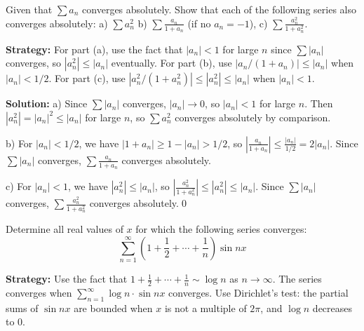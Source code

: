 \begin{problembox}
\begin{problemstatement}
Given that \(\sum a_n\) converges absolutely. Show that each of the following series also converges absolutely:
a) \(\sum a_n^2\) b) \(\sum \frac{a_n}{1 + a_n}\) (if no \(a_n = -1\)),
c) \(\sum \frac{a_n^2}{1 + a_n^2}\).
\end{problemstatement}
\end{problembox}

\noindent\textbf{Strategy:} For part (a), use the fact that \(|a_n| < 1\) for large \(n\) since \(\sum |a_n|\) converges, so \(|a_n^2| \leq |a_n|\) eventually. For part (b), use \(|a_n/(1+a_n)| \leq |a_n|\) when \(|a_n| < 1/2\). For part (c), use \(|a_n^2/(1+a_n^2)| \leq |a_n^2| \leq |a_n|\) when \(|a_n| < 1\).

\bigskip\noindent\textbf{Solution:}
a) Since \(\sum |a_n|\) converges, \(|a_n| \to 0\), so \(|a_n| < 1\) for large \(n\). Then \(|a_n^2| = |a_n|^2 \leq |a_n|\) for large \(n\), so \(\sum a_n^2\) converges absolutely by comparison.

b) For \(|a_n| < 1/2\), we have \(|1 + a_n| \geq 1 - |a_n| > 1/2\), so \(\left|\frac{a_n}{1 + a_n}\right| \leq \frac{|a_n|}{1/2} = 2|a_n|\). Since \(\sum |a_n|\) converges, \(\sum \frac{a_n}{1 + a_n}\) converges absolutely.

c) For \(|a_n| < 1\), we have \(|a_n^2| \leq |a_n|\), so \(\left|\frac{a_n^2}{1 + a_n^2}\right| \leq |a_n^2| \leq |a_n|\). Since \(\sum |a_n|\) converges, \(\sum \frac{a_n^2}{1 + a_n^2}\) converges absolutely.\qed



\begin{problembox}
\begin{problemstatement}
Determine all real values of \(x\) for which the following series converges:
\[\sum_{n=1}^{\infty} \left( 1 + \frac{1}{2} + \cdots + \frac{1}{n} \right) \sin nx\]
\end{problemstatement}
\end{problembox}

\noindent\textbf{Strategy:} Use the fact that \(1 + \frac{1}{2} + \cdots + \frac{1}{n} \sim \log n\) as \(n \to \infty\). The series converges when \(\sum_{n=1}^{\infty} \log n \cdot \sin nx\) converges. Use Dirichlet's test: the partial sums of \(\sin nx\) are bounded when \(x\) is not a multiple of \(2\pi\), and \(\log n\) decreases to 0.

